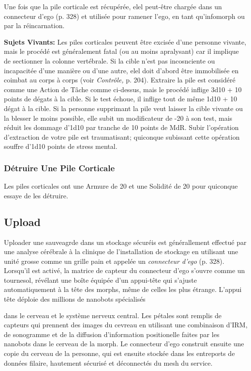 Une fois que la pile corticale est récupérée, elel peut-être chargée dans un connecteur d'ego (p. 328) et utilisée pour ramener l'ego, en tant qu'infomorph ou par la réincarnation. 

\textbf{Sujets Vivants:} Les piles corticales peuvent être excisée d'une personne vivante, mais le procédé est généralement fatal (ou au moins apralysant) car il implique de sectionner la colonne vertébrale. Si la cible n'est pas incosnciente ou incapacitée d'une manière ou d'une autre, elel doit d'abord être immobilisée en coimbat au corps à corps (voir \textit{Contrôle, } p. 204). Extraire la pile est considéré comme une Action de Tâche comme ci-dessus, mais le procédé inflige 3d10 + 10 points de dégats à la cible. Si le test échoue, il inflige tout de même 1d10 + 10 dégat à la cible. Si la personne supprimant la pile veut laisser la cible vivante ou la blesser le moins possible, elle subit un modificateur de -20 à son test, mais réduit les dommage d'1d10 par tranche de 10 points de MdR. Subir l'opération d'extraction de votre pile est traumatisant; quiconque subissant cette opération souffre d'1d10 points de stress mental. 

\subsubsection{Détruire Une Pile Corticale} 

Les piles corticales ont une Armure de 20 et une Solidité de 20 pour quiconque essaye de les détruire. 

\subsection{Upload} 

Uploader une sauveagrde dans un stockage sécuréis est générallement effectué par une analyse cérébrale à la clinique de l'installation de stockage en utilisant une unité grosse comme un grille pain et appelée un \textit{connecteur d'ego} (p. 328). Lorsqu'il est activé, la matrice de capteur du connecteur d'ego s'ouvre comme un tournesol, révélant une boîte équipée d'un appui-tête qui s'ajuste automatiquement à la tête des morphs, même de celles les plus étrange. L'appui tête déploie des millions de nanobots spécialisés 

dans le cerveau et le système nerveux central. Les pétales sont remplis de capteurs qui prennent des images du cevreau en utilisant une combinaison d'IRM, de sonogramme et de la diffusion d'information positionelle faites par les nanobots dans le cerveau de la morph. Le connecteur d'ego construit ensuite une copie du cerveau de la personne, qui est ensuite stockée dans les entrepœts de données filaire, hautement sécurisé et déconnectés du mesh du service. 

